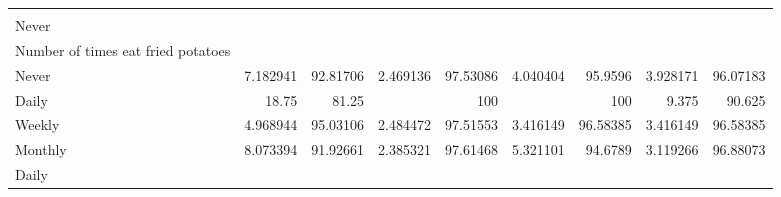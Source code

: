 \documentclass{article}
\begin{document}
\begin{tabular}{lllllllll}
  \multicolumn{1}{|r}{} &
  \multicolumn{1}{r}{} &
  \multicolumn{1}{r}{} &
  \multicolumn{1}{r}{} &
  \multicolumn{1}{r}{} &
  \multicolumn{1}{r}{} &
  \multicolumn{1}{r}{} &
  \multicolumn{1}{r}{} \\
\multicolumn{1}{l}{\hspace{3em}Never} &
  \multicolumn{1}{|r}{} &
  \multicolumn{1}{r}{} &
  \multicolumn{1}{r}{} &
  \multicolumn{1}{r}{} &
  \multicolumn{1}{r}{} &
  \multicolumn{1}{r}{} &
  \multicolumn{1}{r}{} &
  \multicolumn{1}{r}{} \\
\multicolumn{1}{l}{\hspace{4em}Number of times eat fried potatoes} &
  \multicolumn{1}{|r}{} &
  \multicolumn{1}{r}{} &
  \multicolumn{1}{r}{} &
  \multicolumn{1}{r}{} &
  \multicolumn{1}{r}{} &
  \multicolumn{1}{r}{} &
  \multicolumn{1}{r}{} &
  \multicolumn{1}{r}{} \\
\multicolumn{1}{l}{\hspace{5em}Never} &
  \multicolumn{1}{|r}{7.182941} &
  \multicolumn{1}{r}{92.81706} &
  \multicolumn{1}{r}{2.469136} &
  \multicolumn{1}{r}{97.53086} &
  \multicolumn{1}{r}{4.040404} &
  \multicolumn{1}{r}{95.9596} &
  \multicolumn{1}{r}{3.928171} &
  \multicolumn{1}{r}{96.07183} \\
\multicolumn{1}{l}{\hspace{5em}Daily} &
  \multicolumn{1}{|r}{18.75} &
  \multicolumn{1}{r}{81.25} &
  \multicolumn{1}{r}{} &
  \multicolumn{1}{r}{100} &
  \multicolumn{1}{r}{} &
  \multicolumn{1}{r}{100} &
  \multicolumn{1}{r}{9.375} &
  \multicolumn{1}{r}{90.625} \\
\multicolumn{1}{l}{\hspace{5em}Weekly} &
  \multicolumn{1}{|r}{4.968944} &
  \multicolumn{1}{r}{95.03106} &
  \multicolumn{1}{r}{2.484472} &
  \multicolumn{1}{r}{97.51553} &
  \multicolumn{1}{r}{3.416149} &
  \multicolumn{1}{r}{96.58385} &
  \multicolumn{1}{r}{3.416149} &
  \multicolumn{1}{r}{96.58385} \\
\multicolumn{1}{l}{\hspace{5em}Monthly} &
  \multicolumn{1}{|r}{8.073394} &
  \multicolumn{1}{r}{91.92661} &
  \multicolumn{1}{r}{2.385321} &
  \multicolumn{1}{r}{97.61468} &
  \multicolumn{1}{r}{5.321101} &
  \multicolumn{1}{r}{94.6789} &
  \multicolumn{1}{r}{3.119266} &
  \multicolumn{1}{r}{96.88073} \\
\multicolumn{1}{l}{\hspace{3em}Daily} &
  \multicolumn{1}{|r}{} &
  \multicolumn{1}{r}{} &
  \multicolumn{1}{r}{} &
  \multicolumn{1}{r}{} &

\end{tabular}
\end{document}
